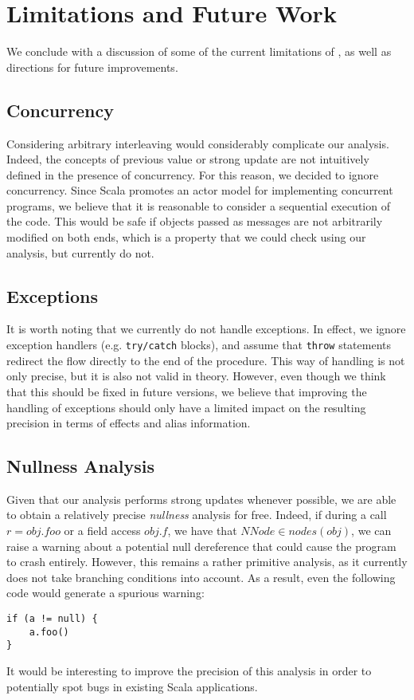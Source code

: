 \chapter{Limitations and Future Work}
We conclude with a discussion of some of the current limitations of \insane, as
well as directions for future improvements.
\label{chap:conclusion}
\section{Concurrency}
Considering arbitrary interleaving would considerably complicate our analysis.
Indeed, the concepts of previous value or strong update are not intuitively
defined in the presence of concurrency. For this reason, we decided to ignore
concurrency. Since Scala promotes an actor model for implementing concurrent
programs, we believe that it is reasonable to consider a sequential execution
of the code. This would be safe if objects passed as messages are not
arbitrarily modified on both ends, which is a property that we could check
using our analysis, but currently do not.

\section{Exceptions}
It is worth noting that we currently do not handle exceptions. In effect, we
ignore exception handlers (e.g. \lstinline{try/catch} blocks), and assume that
\lstinline{throw} statements redirect the flow directly to the end of the
procedure. This way of handling is not only precise, but it is also not
valid in theory. However, even though we think that this should be fixed in
future versions, we believe that improving the handling of exceptions should
only have a limited impact on the resulting precision in terms of effects and
alias information.

\section{Nullness Analysis}
Given that our analysis performs strong updates whenever possible, we are able
to obtain a relatively precise \emph{nullness} analysis for free. Indeed, if during
a call $r = obj.foo$ or a field access $obj.f$, we have that $NNode \in
nodes(obj)$, we can raise a warning about a potential null dereference that
could cause the program to crash entirely. However, this remains a rather
primitive analysis, as it currently does not take branching conditions into
account. As a result, even the following code would generate a spurious warning:
\begin{lstlisting}
if (a != null) {
    a.foo()
}
\end{lstlisting}
It would be interesting to improve the precision of this analysis in order to
potentially spot bugs in existing Scala applications.

